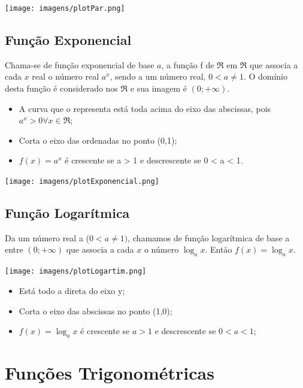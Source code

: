 \documentclass[a4paper,12pt,twoside,BCOR=10mm]{scrbook}
\begin{document}
\begin{titlepage}
\begin{center}
\texttt{[image: imagens/plotPar.png]}
\end{center}

\subsection{Função Exponencial}
Chama-se de função exponencial de base $a$, a função f de $\Re$ em $\Re$ que associa a cada $x$ real o número real $a^{x}$, sendo a um número real, $0 < a \neq 1$. O domínio desta função é considerado nos $\Re$ e sua imagem é $(0 ; +\infty)$.

\begin{itemize}
\item A curva que o representa está toda acima do eixo das abscissas, pois $a^{x} > 0 \forall x \in \Re$;
\item Corta o eixo das ordenadas no ponto (0,1);
\item $f(x) = a^{x}$ é crescente se a > 1 e descrescente se 0 < a < 1.
\end{itemize}

\begin{center}
\texttt{[image: imagens/plotExponencial.png]}
\end{center}

\subsection{Função Logarítmica}
Da um número real a ($0 < a \neq 1)$, chamamos de função logarítmica de base a entre $(0;+\infty)$ que associa a cada $x$ o número $\log_{a}x$. Então $f(x) = \log_{a}x$.

\begin{center}
\texttt{[image: imagens/plotLogartim.png]}
\end{center}

\begin{itemize}
\item Está todo a direta do eixo y;
\item Corta o eixo das abscissas no ponto (1,0);
\item $f(x) = \log_{a}x$ é crescente se $a > 1$ e descrescente se $0 < a < 1$;
\end{itemize}

\section{Funções Trigonométricas}


\end{titlepage}
\end{document}
